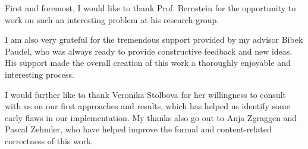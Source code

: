 \begin{acknowledgements}
First and foremost, I would like to thank Prof. Bernstein for the opportunity to work on such an interesting problem at his research group.

I am also very grateful for the tremendous support provided by my advisor Bibek Paudel, who was always ready to provide constructive feedback and new ideas. His support made the overall creation of this work a thoroughly enjoyable and interesting process.

I would further like to thank Veronika Stolbova for her willingness to consult with us on our first approaches and results, which has helped us identify some early flaws in our implementation. My thanks also go out to Anja Zgraggen and Pascal Zehnder, who have helped improve the formal and content-related correctness of this work.
\end{acknowledgements}

